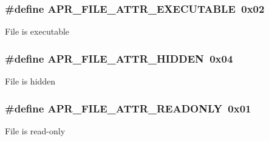 \subsubsection[{\texorpdfstring{A\+P\+R\+\_\+\+F\+I\+L\+E\+\_\+\+A\+T\+T\+R\+\_\+\+E\+X\+E\+C\+U\+T\+A\+B\+LE}{APR_FILE_ATTR_EXECUTABLE}}]{\setlength{\rightskip}{0pt plus 5cm}\#define A\+P\+R\+\_\+\+F\+I\+L\+E\+\_\+\+A\+T\+T\+R\+\_\+\+E\+X\+E\+C\+U\+T\+A\+B\+LE~0x02}\hypertarget{group__apr__file__attrs__set__flags_ga51346f433e354f0bc8722388b6b275fd}{}\label{group__apr__file__attrs__set__flags_ga51346f433e354f0bc8722388b6b275fd}
File is executable 
\subsubsection[{\texorpdfstring{A\+P\+R\+\_\+\+F\+I\+L\+E\+\_\+\+A\+T\+T\+R\+\_\+\+H\+I\+D\+D\+EN}{APR_FILE_ATTR_HIDDEN}}]{\setlength{\rightskip}{0pt plus 5cm}\#define A\+P\+R\+\_\+\+F\+I\+L\+E\+\_\+\+A\+T\+T\+R\+\_\+\+H\+I\+D\+D\+EN~0x04}\hypertarget{group__apr__file__attrs__set__flags_ga68c188c0e56b9abdef3c97ffd913c5aa}{}\label{group__apr__file__attrs__set__flags_ga68c188c0e56b9abdef3c97ffd913c5aa}
File is hidden 
\subsubsection[{\texorpdfstring{A\+P\+R\+\_\+\+F\+I\+L\+E\+\_\+\+A\+T\+T\+R\+\_\+\+R\+E\+A\+D\+O\+N\+LY}{APR_FILE_ATTR_READONLY}}]{\setlength{\rightskip}{0pt plus 5cm}\#define A\+P\+R\+\_\+\+F\+I\+L\+E\+\_\+\+A\+T\+T\+R\+\_\+\+R\+E\+A\+D\+O\+N\+LY~0x01}\hypertarget{group__apr__file__attrs__set__flags_ga333f2c798495cfb95ee624e11c862e38}{}\label{group__apr__file__attrs__set__flags_ga333f2c798495cfb95ee624e11c862e38}
File is read-\/only 